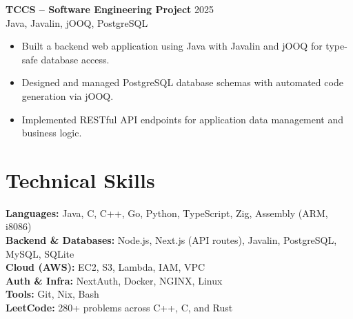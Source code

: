 \documentclass[a4paper,10pt]{article}
\begin{document}
\par\noindent
\textbf{TCCS – Software Engineering Project} \hfill 2025 \\
Java, Javalin, jOOQ, PostgreSQL

\begin{itemize}[noitemsep, topsep=1pt]
    \item Built a backend web application using Java with Javalin and jOOQ for type-safe database access.
    \item Designed and managed PostgreSQL database schemas with automated code generation via jOOQ.
    \item Implemented RESTful API endpoints for application data management and business logic.
\end{itemize}

\section*{Technical Skills}
\vspace{-6pt}

\textbf{Languages:} Java, C, C++, Go, Python, TypeScript, Zig, Assembly (ARM, i8086) \\
\textbf{Backend \& Databases:} Node.js, Next.js (API routes), Javalin, PostgreSQL, MySQL, SQLite \\
\textbf{Cloud (AWS):} EC2, S3, Lambda, IAM, VPC \\
\textbf{Auth \& Infra:} NextAuth, Docker, NGINX, Linux \\
\textbf{Tools:} Git, Nix, Bash \\
\textbf{LeetCode:} 280+ problems across C++, C, and Rust \\
\end{document}
